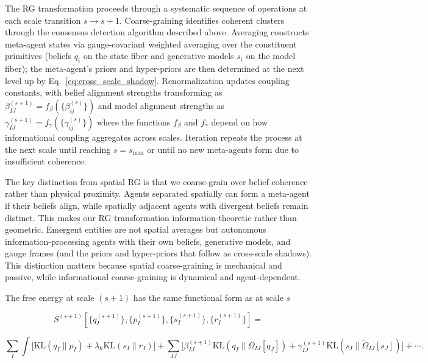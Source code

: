 \documentclass[11pt]{article}
\begin{document}
The RG transformation proceeds through a systematic sequence of operations at each scale transition $s \to s+1$. Coarse-graining identifies coherent clusters through the consensus detection algorithm described above. Averaging constructs meta-agent states via gauge-covariant weighted averaging over the constituent primitives (beliefs $q_i$ on the state fiber and generative models $s_i$ on the model fiber); the meta-agent's priors and hyper-priors are then determined at the next level up by Eq.~\eqref{eq:cross_scale_shadow}. Renormalization updates coupling constants, with belief alignment strengths transforming as $\beta_{IJ}^{(s+1)} = f_\beta(\{\beta_{ij}^{(s)}\})$ and model alignment strengths as $\gamma_{IJ}^{(s+1)} = f_\gamma(\{\gamma_{ij}^{(s)}\})$ where the functions $f_\beta$ and $f_\gamma$ depend on how informational coupling aggregates across scales. Iteration repeats the process at the next scale until reaching $s = s_{\max}$ or until no new meta-agents form due to insufficient coherence.

The key distinction from spatial RG is that we coarse-grain over belief coherence rather than physical proximity. Agents separated spatially can form a meta-agent if their beliefs align, while spatially adjacent agents with divergent beliefs remain distinct. This makes our RG transformation information-theoretic rather than geometric. Emergent entities are not spatial averages but autonomous information-processing agents with their own beliefs, generative models, and gauge frames (and the priors and hyper-priors that follow as cross-scale shadows). This distinction matters because spatial coarse-graining is mechanical and passive, while informational coarse-graining is dynamical and agent-dependent.

The free energy at scale $(s+1)$ has the same functional form as at scale $s$

\begin{equation}
S^{(s+1)}[\{q_I^{(s+1)}\}, \{p_I^{(s+1)}\}, \{s_I^{(s+1)}\}, \{r_I^{(s+1)}\}] = 
\end{equation}

\begin{equation}
\sum_I \int \big[\mathrm{KL}(q_I \| p_I) + \lambda_h\mathrm{KL}(s_I \| r_I)\big] + \sum_{IJ} \big[\beta_{IJ}^{(s+1)} \mathrm{KL}(q_I \| \Omega_{IJ}[q_J]) + \gamma_{IJ}^{(s+1)} \mathrm{KL}(s_I \| \tilde\Omega_{IJ}[s_J])\big] + \cdots.
\end{equation}
\end{document}
